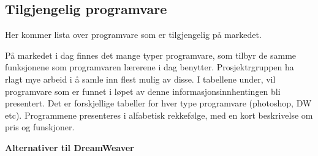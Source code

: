 \subsection{Tilgjengelig programvare }
{\color {red} Her kommer lista over programvare som er tilgjengelig på markedet. }

På markedet i dag finnes det mange typer programvare, som tilbyr de samme funksjonene som programvaren 
lærerene i dag benytter. Prosjektrgruppen ha rlagt mye arbeid i å samle inn flest mulig av disse. 
I tabellene under, vil programvare som er funnet i løpet av denne informasjonsinnhentingen bli presentert.
Det er forskjellige tabeller for hver type programvare (photoshop, DW etc). 
Programmene presenteres i alfabetisk rekkefølge, med en kort beskrivelse om pris og funskjoner.

\textbf {Alternativer til DreamWeaver}

